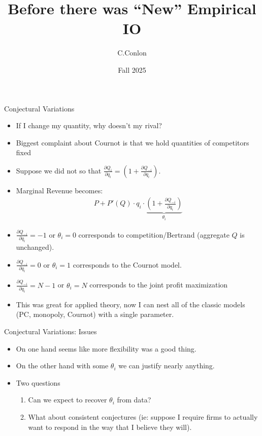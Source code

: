 \documentclass[aspectratio=169,11pt]{beamer}
\title [``Old'' IO]{Before there was ``New'' Empirical IO}
\author{C.Conlon}
\institute{Grad IO }
\date{Fall 2025}
\begin{document}
\begin{frame}
\titlepage
\end{frame}

\begin{frame}{Conjectural Variations}
\small
\begin{itemize}
\item If I change my quantity, why doesn't my rival?
\item Biggest complaint about Cournot is that we hold quantities of competitors fixed
\item Suppose we did not so that $\frac{\partial Q_i}{\partial q_i} = (1 + \frac{\partial Q_{-i}}{\partial q_i}).$
\item Marginal Revenue becomes:
\begin{eqnarray*}
P + P'(Q) \cdot q_i \cdot \underbrace{\left(1+ \frac{\partial Q_{-i}}{\partial q_i} \right)}_{\theta_i}
\end{eqnarray*}
\item $\frac{\partial Q_{-i}}{\partial q_i} =-1$  or $\theta_i =0$ corresponds to competition/Bertrand (aggregate $Q$ is unchanged).
\item $\frac{\partial Q_{-i}}{\partial q_i} =0$ or $\theta_i = 1$ corresponds to the Cournot model.
\item $\frac{\partial Q_{-i}}{\partial q_i} =N-1$ or $\theta_i = N$ corresponds to the joint profit maximization
\item This was great for applied theory, now I can nest all of the classic models (PC, monopoly, Cournot) with a single parameter.
\end{itemize}
\end{frame}

\begin{frame}{Conjectural Variations: Issues}
\begin{itemize}
\item On one hand seems like more flexibility was a good thing.
\item On the other hand with some $\theta_i$ we can justify nearly anything.
\item Two questions
\begin{enumerate}
\item Can we expect to recover $\theta_i$ from data?
\item What about \alert{consistent conjectures} (ie: suppose I require firms to actually want to respond in the way that I believe they will).
\end{enumerate}
\end{itemize}
\end{frame}
\end{document}
